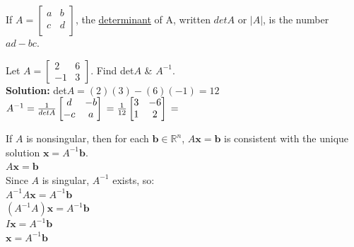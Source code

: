 \documentclass{report}
\begin{document}
\begin{definition}
If $A = \begin{bmatrix}
	a & b \\
	c & d \\
	\end{bmatrix}$, the \underline{determinant} of A, written $detA$ or $|A|$, is the number $ad - bc$.
\end{definition}

\begin{example}
Let $A = \begin{bmatrix} 2 & 6 \\ -1 & 3 \end{bmatrix}$. Find det$A$ \& $A^{-1}$.\\
\smallskip\textbf{Solution:}
det$A = (2)(3) - (6)(-1) = 12$\\
$A^{-1} = \frac{1}{det A}\begin{bmatrix} d & -b \\ -c & a \end{bmatrix}\\
= \frac{1}{12} \begin{bmatrix} 3 & -6 \\ 1 & 2 \end{bmatrix}\\
= $
\end{example}

\begin{theorem}
If $A$ is nonsingular, then for each $\mathbf{b}\in\mathbb{R}^n$, $A\mathbf{x}=\mathbf{b}$ is consistent with the unique solution $\mathbf{x}=A^{-1}\mathbf{b}$.\\
$A\mathbf{x}=\mathbf{b}$\\
Since $A$ is singular, $A^{-1}$ exists, so:\\
$A^{-1}A\mathbf{x}=A^{-1}\mathbf{b}$\\
$(A^{-1}A)\mathbf{x}=A^{-1}\mathbf{b}$\\
$I\mathbf{x}=A^{-1}\mathbf{b}$\\
$\mathbf{x}=A^{-1}\mathbf{b}$\\
\end{theorem}
\end{document}
